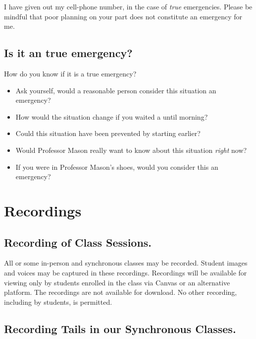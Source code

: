 I have given out my cell-phone number, in the case of \emph{true} emergencies. Please be mindful that poor planning on your part does not constitute an emergency for me.

\hypertarget{is-it-an-true-emergency}{%
\subsection{Is it an true emergency?}\label{is-it-an-true-emergency}}

How do you know if it is a true emergency?

\begin{itemize}
\tightlist
\item
  Ask yourself, would a reasonable person consider this situation an emergency?
\item
  How would the situation change if you waited a until morning?
\item
  Could this situation have been prevented by starting earlier?
\item
  Would Professor Mason really want to know about this situation \emph{right} now?
\item
  If you were in Professor Mason's shoes, would you consider this an emergency?
\end{itemize}

\hypertarget{recordings}{%
\section{Recordings}\label{recordings}}

\hypertarget{recording-of-class-sessions.}{%
\subsection{Recording of Class Sessions.}\label{recording-of-class-sessions.}}

All or some in-person and synchronous classes may be recorded. Student images and voices may be captured in these recordings. Recordings will be available for viewing only by students enrolled in the class via Canvas or an alternative platform. The recordings are not available for download. No other recording, including by students, is permitted.

\hypertarget{recording-tails-in-our-synchronous-classes.}{%
\subsection{Recording Tails in our Synchronous Classes.}\label{recording-tails-in-our-synchronous-classes.}}

